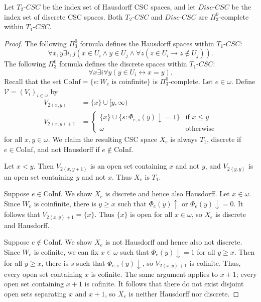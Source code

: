 \documentclass[11pt]{amsart}
\theoremstyle{remark}
\begin{document}
\begin{theorem}\label{thm:T2Completeness}
    Let $T_2$-$CSC$ be the index set of Hausdorff CSC spaces, and let $Disc$-$CSC$ be the index set of discrete CSC spaces. Both $T_2$-$CSC$ and $Disc$-$CSC$ are $\Pi^0_3$-complete within $T_1$-$CSC$.
\end{theorem}
\begin{proof}
    The following $\Pi^0_3$ formula defines the Hausdorff spaces within $T_1$-$CSC$:
    \begin{equation*}
        \forall x, y \exists i, j (x \in U_i \land y \in U_j \land \forall z (z \in U_i \rightarrow z \notin U_j)).
    \end{equation*}
    The following $\Pi^0_3$ formula defines the discrete spaces within $T_1$-$CSC$:
    \begin{equation*}
        \forall x \exists i \forall y (y \in U_i \leftrightarrow x = y).
    \end{equation*}
    Recall that the set $\mathrm{CoInf} = \{e : \text{$W_e$ is coinfinite}\}$ is $\Pi^0_3$-complete. Let $e \in \omega$. Define $\mathcal{V} = (V_i)_{i \in \omega}$ by
    \begin{align*}
        V_{2\left\langle x, y \right\rangle} &= \{x\} \cup [y, \infty)\\
        V_{2\left\langle x, y \right\rangle + 1} &= \begin{cases}
            \{x\} \cup \{s : \Phi_{e, s}(y) \downarrow=1\} & \text{if $x \leq y$}\\
            \omega & \text{otherwise}
        \end{cases}
    \end{align*}
    for all $x, y \in \omega$. We claim the resulting CSC space $X_e$ is always $T_1$, discrete if $e \in \mathrm{CoInf}$, and not Hausdorff if $e \notin \mathrm{CoInf}$.

    Let $x < y$. Then $V_{2\left\langle x, y + 1 \right\rangle}$ is an open set containing $x$ and not $y$, and $V_{2\left\langle y, y \right\rangle}$ is an open set containing $y$ and not $x$. Thus $X_e$ is $T_1$.

    Suppose $e \in \mathrm{CoInf}$. We show $X_e$ is discrete and hence also Hausdorff. Let $x \in \omega$. Since $W_e$ is coinfinite, there is $y \geq x$ such that $\Phi_e(y) \uparrow$ or $\Phi_e(y) \downarrow=0$. It follows that $V_{2\left\langle x, y \right\rangle + 1} = \{x\}$. Thus $\{x\}$ is open for all $x \in \omega$, so $X_e$ is discrete and Hausdorff.

    Suppose $e \notin \mathrm{CoInf}$. We show $X_e$ is not Hausdorff and hence also not discrete. Since $W_e$ is cofinite, we can fix $x \in \omega$ such that $\Phi_e(y) \downarrow=1$ for all $y \geq x$. Then for all $y \geq x$, there is $s$ such that $\Phi_{e, s}(y) \downarrow$, so $V_{2\left\langle x, y\right\rangle + 1}$ is cofinite. Thus, every open set containing $x$ is cofinite. The same argument applies to $x + 1$; every open set containing $x + 1$ is cofinite. It follows that there do not exist disjoint open sets separating $x$ and $x + 1$, so $X_e$ is neither Hausdorff nor discrete.
\end{proof}
\end{document}
